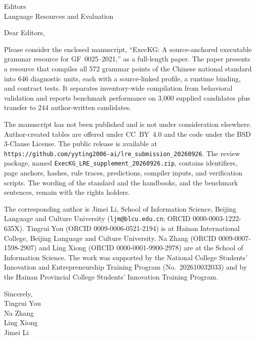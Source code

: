 \documentclass[11pt]{article}
\begin{document}
\noindent Editors\\
Language Resources and Evaluation

\vspace{1em}
\noindent Dear Editors,

Please consider the enclosed manuscript, ``ExecKG: A source-anchored executable grammar resource for GF~0025--2021,'' as a full-length paper.
The paper presents a resource that compiles all 572 grammar points of the Chinese national standard into 646 diagnostic units, each with a source-linked profile, a runtime binding, and contract tests.
It separates inventory-wide compilation from behavioral validation and reports benchmark performance on 3{,}000 supplied candidates plus transfer to 244 author-written candidates.

The manuscript has not been published and is not under consideration elsewhere.
Author-created tables are offered under CC~BY~4.0 and the code under the BSD 3-Clause License.
The public release is available at \texttt{https://github.com/yyting2006-ai/lre\_submission\_20260926}.
The review package, named \texttt{ExecKG\_LRE\_supplement\_20260926.zip}, contains identifiers, page anchors, hashes, rule traces, predictions, compiler inputs, and verification scripts.
The wording of the standard and the handbooks, and the benchmark sentences, remain with the rights holders.

The corresponding author is Jimei Li, School of Information Science, Beijing Language and Culture University (\texttt{ljm@blcu.edu.cn}; ORCID 0000-0003-1222-635X).
Tingrui You (ORCID 0009-0006-0521-2194) is at Hainan International College, Beijing Language and Culture University.
Na Zhang (ORCID 0009-0007-1598-2907) and Ling Xiong (ORCID 0000-0001-9900-2978) are at the School of Information Science.
The work was supported by the National College Students' Innovation and Entrepreneurship Training Program (No.~202610032033) and by the Hainan Provincial College Students' Innovation Training Program.

\vspace{1em}
\noindent Sincerely,\\[0.6em]
Tingrui You\\
Na Zhang\\
Ling Xiong\\
Jimei Li
\end{document}
